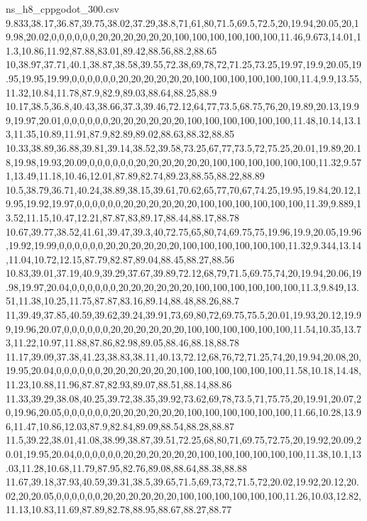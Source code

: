 \begin{filecontents*}[overwrite]{ns_h8_cppgodot_300.csv}
9.833,38.17,36.87,39.75,38.02,37.29,38.8,71,61,80,71.5,69.5,72.5,20,19.94,20.05,20,19.98,20.02,0,0,0,0,0,0,20,20,20,20,20,20,100,100,100,100,100,100,11.46,9.673,14.01,11.3,10.86,11.92,87.88,83.01,89.42,88.56,88.2,88.65
10,38.97,37.71,40.1,38.87,38.58,39.55,72.38,69,78,72,71.25,73.25,19.97,19.9,20.05,19.95,19.95,19.99,0,0,0,0,0,0,20,20,20,20,20,20,100,100,100,100,100,100,11.4,9.9,13.55,11.32,10.84,11.78,87.9,82.9,89.03,88.64,88.25,88.9
10.17,38.5,36.8,40.43,38.66,37.3,39.46,72.12,64,77,73.5,68.75,76,20,19.89,20.13,19.99,19.97,20.01,0,0,0,0,0,0,20,20,20,20,20,20,100,100,100,100,100,100,11.48,10.14,13.13,11.35,10.89,11.91,87.9,82.89,89.02,88.63,88.32,88.85
10.33,38.89,36.88,39.81,39.14,38.52,39.58,73.25,67,77,73.5,72,75.25,20.01,19.89,20.18,19.98,19.93,20.09,0,0,0,0,0,0,20,20,20,20,20,20,100,100,100,100,100,100,11.32,9.571,13.49,11.18,10.46,12.01,87.89,82.74,89.23,88.55,88.22,88.89
10.5,38.79,36.71,40.24,38.89,38.15,39.61,70.62,65,77,70,67,74.25,19.95,19.84,20.12,19.95,19.92,19.97,0,0,0,0,0,0,20,20,20,20,20,20,100,100,100,100,100,100,11.39,9.889,13.52,11.15,10.47,12.21,87.87,83,89.17,88.44,88.17,88.78
10.67,39.77,38.52,41.61,39.47,39.3,40,72.75,65,80,74,69.75,75,19.96,19.9,20.05,19.96,19.92,19.99,0,0,0,0,0,0,20,20,20,20,20,20,100,100,100,100,100,100,11.32,9.344,13.14,11.04,10.72,12.15,87.79,82.87,89.04,88.45,88.27,88.56
10.83,39.01,37.19,40.9,39.29,37.67,39.89,72.12,68,79,71.5,69.75,74,20,19.94,20.06,19.98,19.97,20.04,0,0,0,0,0,0,20,20,20,20,20,20,100,100,100,100,100,100,11.3,9.849,13.51,11.38,10.25,11.75,87.87,83.16,89.14,88.48,88.26,88.7
11,39.49,37.85,40.59,39.62,39.24,39.91,73,69,80,72,69.75,75.5,20.01,19.93,20.12,19.99,19.96,20.07,0,0,0,0,0,0,20,20,20,20,20,20,100,100,100,100,100,100,11.54,10.35,13.73,11.22,10.97,11.88,87.86,82.98,89.05,88.46,88.18,88.78
11.17,39.09,37.38,41.23,38.83,38.11,40.13,72.12,68,76,72,71.25,74,20,19.94,20.08,20,19.95,20.04,0,0,0,0,0,0,20,20,20,20,20,20,100,100,100,100,100,100,11.58,10.18,14.48,11.23,10.88,11.96,87.87,82.93,89.07,88.51,88.14,88.86
11.33,39.29,38.08,40.25,39.72,38.35,39.92,73.62,69,78,73.5,71,75.75,20,19.91,20.07,20,19.96,20.05,0,0,0,0,0,0,20,20,20,20,20,20,100,100,100,100,100,100,11.66,10.28,13.96,11.47,10.86,12.03,87.9,82.84,89.09,88.54,88.28,88.87
11.5,39.22,38.01,41.08,38.99,38.87,39.51,72.25,68,80,71,69.75,72.75,20,19.92,20.09,20.01,19.95,20.04,0,0,0,0,0,0,20,20,20,20,20,20,100,100,100,100,100,100,11.38,10.1,13.03,11.28,10.68,11.79,87.95,82.76,89.08,88.64,88.38,88.88
11.67,39.18,37.93,40.59,39.31,38.5,39.65,71.5,69,73,72,71.5,72,20.02,19.92,20.12,20.02,20,20.05,0,0,0,0,0,0,20,20,20,20,20,20,100,100,100,100,100,100,11.26,10.03,12.82,11.13,10.83,11.69,87.89,82.78,88.95,88.67,88.27,88.77

\end{filecontents*}
